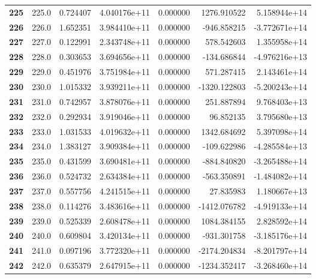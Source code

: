 \documentclass{report}[12pt]
\begin{document}
\begin{center}
\begin{tabular}{lrrrrrr}
\textbf{225 } &          225.0 &   0.724407 &  4.040176e+11 &    0.000000 &  1276.910522 &  5.158944e+14 \\
\textbf{226 } &          226.0 &   1.652351 &  3.984410e+11 &    0.000000 &  -946.858215 & -3.772671e+14 \\
\textbf{227 } &          227.0 &   0.122991 &  2.343748e+11 &    0.000000 &   578.542603 &  1.355958e+14 \\
\textbf{228 } &          228.0 &   0.303653 &  3.694656e+11 &    0.000000 &  -134.686844 & -4.976216e+13 \\
\textbf{229 } &          229.0 &   0.451976 &  3.751984e+11 &    0.000000 &   571.287415 &  2.143461e+14 \\
\textbf{230 } &          230.0 &   1.015332 &  3.939211e+11 &    0.000000 & -1320.122803 & -5.200243e+14 \\
\textbf{231 } &          231.0 &   0.742957 &  3.878076e+11 &    0.000000 &   251.887894 &  9.768403e+13 \\
\textbf{232 } &          232.0 &   0.292934 &  3.919046e+11 &    0.000000 &    96.852135 &  3.795680e+13 \\
\textbf{233 } &          233.0 &   1.031533 &  4.019632e+11 &    0.000000 &  1342.684692 &  5.397098e+14 \\
\textbf{234 } &          234.0 &   1.383127 &  3.909384e+11 &    0.000000 &  -109.622986 & -4.285584e+13 \\
\textbf{235 } &          235.0 &   0.431599 &  3.690481e+11 &    0.000000 &  -884.840820 & -3.265488e+14 \\
\textbf{236 } &          236.0 &   0.524732 &  2.634384e+11 &    0.000000 &  -563.350891 & -1.484082e+14 \\
\textbf{237 } &          237.0 &   0.557756 &  4.241515e+11 &    0.000000 &    27.835983 &  1.180667e+13 \\
\textbf{238 } &          238.0 &   0.114276 &  3.483616e+11 &    0.000000 & -1412.076782 & -4.919133e+14 \\
\textbf{239 } &          239.0 &   0.525339 &  2.608478e+11 &    0.000000 &  1084.384155 &  2.828592e+14 \\
\textbf{240 } &          240.0 &   0.609804 &  3.420134e+11 &    0.000000 &  -931.301758 & -3.185176e+14 \\
\textbf{241 } &          241.0 &   0.097196 &  3.772320e+11 &    0.000000 & -2174.204834 & -8.201797e+14 \\
\textbf{242 } &          242.0 &   0.635379 &  2.647915e+11 &    0.000000 & -1234.352417 & -3.268460e+14 \\

\end{tabular}
\end{center}
\end{document}
